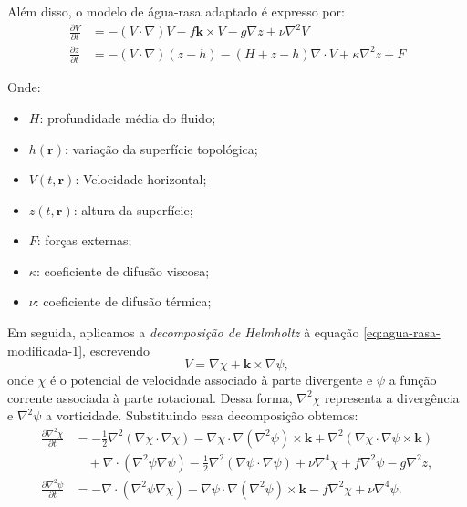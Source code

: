 Além disso, o modelo de água-rasa adaptado é expresso por:
\begin{align}
	\frac{\partial V}{\partial t} & = - ( V \cdot \nabla)V - f \mathbf{k} \times V - g \nabla z + \nu \nabla^2 V \label{eq:agua-rasa-modificada-1}     \\
	\frac{\partial z}{\partial t} & = - (V \cdot \nabla)(z - h) - (H + z - h)\nabla \cdot  V + \kappa \nabla^2 z + F \label{eq:agua-rasa-modificada-2} 
\end{align}

Onde:
    \begin{itemize}
    	\item $H$: profundidade média do fluido;
    	\item $h(\mathbf{r})$: variação da superfície topológica;
    	\item $V(t,\mathbf{r})$: Velocidade horizontal;
    	\item $z(t,\mathbf{r})$: altura da superfície;
    	\item $F$: forças externas;
    	\item $\kappa$: coeficiente de difusão viscosa;
    	\item $\nu$: coeficiente de difusão térmica;
    \end{itemize}

Em seguida, aplicamos a \textit{decomposição de Helmholtz} à equação \eqref{eq:agua-rasa-modificada-1}, escrevendo
\begin{equation*}
	V = \nabla \chi + \mathbf{k} \times \nabla \psi,
\end{equation*}
onde $\chi$ é o potencial de velocidade associado à parte divergente e $\psi$ a função corrente associada à parte rotacional. Dessa forma, $\nabla^2 \chi$ representa a divergência e $\nabla^2 \psi$ a vorticidade. Substituindo essa decomposição obtemos:
\begin{align}
	\frac{\partial \nabla^2 \chi}{\partial t} & = -\tfrac{1}{2}\nabla^2(\nabla \chi \cdot \nabla \chi) 
	- \nabla \chi \cdot \nabla(\nabla^2\psi) \times \mathbf{k} 
	+ \nabla^2(\nabla \chi \cdot \nabla \psi \times \mathbf{k}) \nonumber \\
    & \quad + \nabla \cdot (\nabla^2\psi\nabla\psi)          
	- \tfrac{1}{2}\nabla^2(\nabla \psi \cdot \nabla \psi) 
	+ \nu\nabla^4\chi + f\nabla^2\psi - g\nabla^2z, \label{eq:equacao-basica-1} \\
	\frac{\partial \nabla^2 \psi}{\partial t} & = -\nabla \cdot (\nabla^2\psi\nabla \chi)              
	- \nabla \psi \cdot \nabla(\nabla^2\psi) \times \mathbf{k} 
	- f\nabla^2\chi + \nu\nabla^4\psi. \label{eq:equacao-basica-2}
\end{align}

